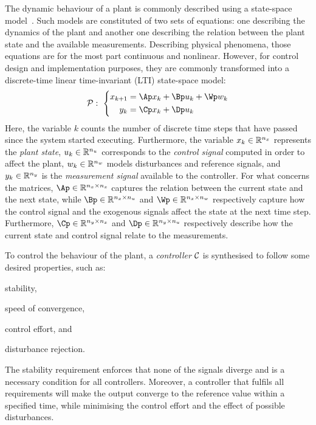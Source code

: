 The dynamic behaviour of a plant is commonly described using a state-space model~\cite{Astrom:2008}. 
Such models are constituted of two sets of equations: one describing the dynamics of the plant and another one describing the relation between the plant state and the available measurements. 
Describing physical phenomena, those equations are for the most part continuous and nonlinear. 
However, for control design and implementation purposes, they are commonly transformed into a discrete-time linear time-invariant (LTI) state-space model:
\begin{equation}
    \label{eq:plant}
    \plant: \,\, \left\{
    \begin{aligned}
        x_{k+1} &= \Ap x_k + \Bp u_k + \Wp w_k \\
        y_k &= \Cp x_k + \Dp u_k 
    \end{aligned}
    \right.
\end{equation}
Here, the variable $k$ counts the number of discrete time steps that have passed since the system started executing. 
Furthermore, the variable $x_k \in \mathbb{R}^{n_x}$ represents the \emph{plant state}, $u_k \in \mathbb{R}^{n_u}$ corresponds to the \emph{control signal} computed in order to affect the plant, $w_k \in \mathbb{R}^{n_w}$ models disturbances and reference signals, and $y_k \in \mathbb{R}^{n_y}$ is the \emph{measurement signal} available to the controller. 
For what concerns the matrices, $\Ap \in \R^{n_x \times n_x}$ captures the relation between the current state and the next state, while $\Bp \in \R^{n_x \times n_u}$ and $\Wp \in \R^{n_x \times n_w}$ respectively capture how the control signal and the exogenous signals affect the state at the next time step.
Furthermore, $\Cp \in \R^{n_y \times n_x}$ and $\Dp \in \R^{n_y \times n_u}$ respectively describe how the current state and control signal relate to the measurements.

To control the behaviour of the plant, a \emph{controller} $\mathcal{C}$ is synthesised to follow some desired properties, such as: 
\begin{enumerate*}[label=(\roman*)]
    \item stability, 
    \item speed of convergence, 
    \item control effort, and 
    \item disturbance rejection.
\end{enumerate*}
The stability requirement enforces that none of the signals diverge and is a necessary condition for all controllers.
Moreover, a controller that fulfils all requirements will make the output converge to the reference value within a specified time, while minimising the control effort and the effect of possible disturbances.

